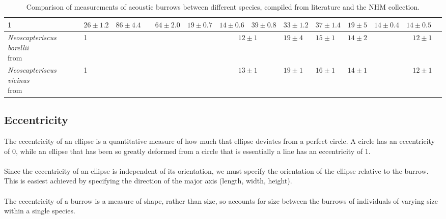 \documentclass{article}
\begin{document}
\begin{landscape}
\begin{table}
\begin{tabular}{|l|l|l|l|l|l|l|l|l|l|l|l|l|l|}
		   			1 &
		   			$26\pm1.2$ &
		   			$86\pm4.4$ &
		   			&
		   			$64\pm2.0$ &
		   			$19\pm0.7$ &
		   			$14\pm0.6$ &
		   			$39\pm0.8$ &
		   			$33\pm1.2$ &
		   			$37\pm1.4$ &
		   			$19\pm5$ &
		   			$14\pm0.4$ &
		   			$14\pm0.5$ \\
		   	\hline 	\makecell{\textit{Neoscapteriscus borellii}\\from \cite{nickerson1979}} &
				   	1 &
				   	&
				   	&
				   	&
				   	&
				   	\multicolumn{2}{c|}{$12\pm1$} &
				   	$19\pm4$ &
				   	$15\pm1$ &
				   	$14\pm2$ &
				   	&
				   	\multicolumn{2}{c|}{$12\pm1$} \\
			\hline 	\makecell{\textit{Neoscapteriscus vicinus}\\from \cite{nickerson1979}} &
					1 &
					&
					&
					&
					&
					\multicolumn{2}{c|}{$13\pm1$} &
					$19\pm1$ &
					$16\pm1$ &
					$14\pm1$ &
					&
					\multicolumn{2}{c|}{$12\pm1$} \\	
   			\hline
   		
   		\end{tabular} 
   		\caption{Comparison of measurements of acoustic burrows between different species, compiled from literature and the NHM collection.}
   		\label{tab:comparisons}
   	\end{table}
   \end{landscape}
   \subsection{Eccentricity}
   The eccentricity of an ellipse is a quantitative measure of how much that ellipse deviates from a perfect circle. A circle has an eccentricity of 0, while an ellipse that has been so greatly deformed from a circle that is essentially a line has an eccentricity of 1.
   
   \paragraph{}
   Since the eccentricity of an ellipse is independent of its orientation, we must specify the orientation of the ellipse relative to the burrow. This is easiest achieved by specifying the direction of the major axis (length, width, height).
   
   \paragraph{}
   The eccentricity of a burrow is a measure of shape, rather than size, so accounts for size between the burrows of individuals of varying size within a single species.
      
\end{document}
